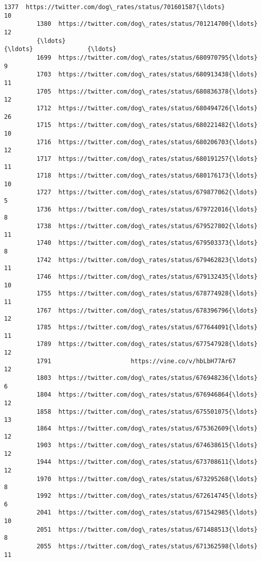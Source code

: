 \documentclass[11pt]{article}
\begin{document}
\begin{Verbatim}[commandchars=\\\{\}]
         1377  https://twitter.com/dog\_rates/status/701601587{\ldots}                10   
         1380  https://twitter.com/dog\_rates/status/701214700{\ldots}                12   
         {\ldots}                                                 {\ldots}               {\ldots}   
         1699  https://twitter.com/dog\_rates/status/680970795{\ldots}                 9   
         1703  https://twitter.com/dog\_rates/status/680913438{\ldots}                11   
         1705  https://twitter.com/dog\_rates/status/680836378{\ldots}                12   
         1712  https://twitter.com/dog\_rates/status/680494726{\ldots}                26   
         1715  https://twitter.com/dog\_rates/status/680221482{\ldots}                10   
         1716  https://twitter.com/dog\_rates/status/680206703{\ldots}                12   
         1717  https://twitter.com/dog\_rates/status/680191257{\ldots}                11   
         1718  https://twitter.com/dog\_rates/status/680176173{\ldots}                10   
         1727  https://twitter.com/dog\_rates/status/679877062{\ldots}                 5   
         1736  https://twitter.com/dog\_rates/status/679722016{\ldots}                 8   
         1738  https://twitter.com/dog\_rates/status/679527802{\ldots}                11   
         1740  https://twitter.com/dog\_rates/status/679503373{\ldots}                 8   
         1742  https://twitter.com/dog\_rates/status/679462823{\ldots}                11   
         1746  https://twitter.com/dog\_rates/status/679132435{\ldots}                10   
         1755  https://twitter.com/dog\_rates/status/678774928{\ldots}                11   
         1767  https://twitter.com/dog\_rates/status/678396796{\ldots}                12   
         1785  https://twitter.com/dog\_rates/status/677644091{\ldots}                11   
         1789  https://twitter.com/dog\_rates/status/677547928{\ldots}                12   
         1791                      https://vine.co/v/hbLbH77Ar67                12   
         1803  https://twitter.com/dog\_rates/status/676948236{\ldots}                 6   
         1804  https://twitter.com/dog\_rates/status/676946864{\ldots}                12   
         1858  https://twitter.com/dog\_rates/status/675501075{\ldots}                13   
         1864  https://twitter.com/dog\_rates/status/675362609{\ldots}                12   
         1903  https://twitter.com/dog\_rates/status/674638615{\ldots}                12   
         1944  https://twitter.com/dog\_rates/status/673708611{\ldots}                12   
         1970  https://twitter.com/dog\_rates/status/673295268{\ldots}                 8   
         1992  https://twitter.com/dog\_rates/status/672614745{\ldots}                 6   
         2041  https://twitter.com/dog\_rates/status/671542985{\ldots}                10   
         2051  https://twitter.com/dog\_rates/status/671488513{\ldots}                 8   
         2055  https://twitter.com/dog\_rates/status/671362598{\ldots}                11   
         

\end{Verbatim}
\end{document}
